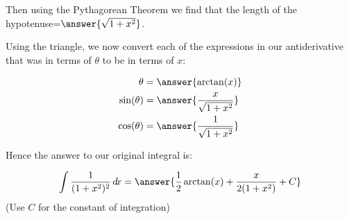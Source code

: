 \documentclass{ximera}
\begin{document}
\begin{exercise}
\begin{exercise}
\begin{exercise}
Then using the Pythagorean Theorem we find that the
 length of the hypotenuse=$\answer{\sqrt{1+x^{2}}}$. 

Using the triangle, we now convert each of the expressions in our antiderivative that was in terms of $\theta$ to be in terms of $x$:

\begin{align}
\theta&=\answer{\arctan(x)} \\
\sin(\theta)&=\answer{\frac{x}{\sqrt{1+x^{2}}}} \\
 \cos(\theta)&=\answer{\frac{1}{\sqrt{1+x^{2}}}} 
\end{align}

\begin{exercise}
Hence the answer to our original integral is: 

\[
\int \frac{1}{ (1+x^{2})^{2}} \d x= \answer{ \frac{1}{2}\arctan(x) + \frac{x}{2(1+x^{2})} + C }
\]
(Use $C$ for the constant of integration)





\end{exercise}
\end{exercise}

\end{exercise}

\end{exercise}
\end{document}
